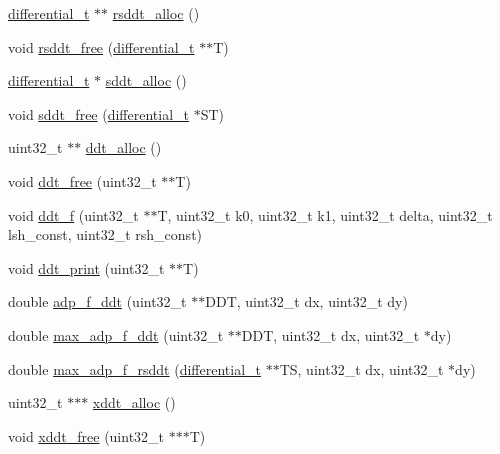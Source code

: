 \begin{DoxyCompactItemize}
\item 
\hyperlink{structdifferential__t}{differential\-\_\-t} $\ast$$\ast$ \hyperlink{adp-tea-f-fk-ddt_8hh_a9b33673043159fc8155fd759672a27b0}{rsddt\-\_\-alloc} ()
\item 
void \hyperlink{adp-tea-f-fk-ddt_8hh_a12b44b7012a0e2d3f1760784e6f8a482}{rsddt\-\_\-free} (\hyperlink{structdifferential__t}{differential\-\_\-t} $\ast$$\ast$\-T)
\item 
\hyperlink{structdifferential__t}{differential\-\_\-t} $\ast$ \hyperlink{adp-tea-f-fk-ddt_8hh_a0395ec92dbc818f2b8779389392ec023}{sddt\-\_\-alloc} ()
\item 
void \hyperlink{adp-tea-f-fk-ddt_8hh_a38f85fc23a1e6bf662e3359513451826}{sddt\-\_\-free} (\hyperlink{structdifferential__t}{differential\-\_\-t} $\ast$\-S\-T)
\item 
uint32\-\_\-t $\ast$$\ast$ \hyperlink{adp-tea-f-fk-ddt_8hh_a700c0928ef26a9130e4309c8b603792c}{ddt\-\_\-alloc} ()
\item 
void \hyperlink{adp-tea-f-fk-ddt_8hh_a0cfc92867fc1d471847ec25a48bcfb8d}{ddt\-\_\-free} (uint32\-\_\-t $\ast$$\ast$\-T)
\item 
void \hyperlink{adp-tea-f-fk-ddt_8hh_af2b10deffd82820ece2d258c915c8a90}{ddt\-\_\-f} (uint32\-\_\-t $\ast$$\ast$\-T, uint32\-\_\-t k0, uint32\-\_\-t k1, uint32\-\_\-t delta, uint32\-\_\-t lsh\-\_\-const, uint32\-\_\-t rsh\-\_\-const)
\item 
void \hyperlink{adp-tea-f-fk-ddt_8hh_ae45c4755238695992a8343a7a5fe4e95}{ddt\-\_\-print} (uint32\-\_\-t $\ast$$\ast$\-T)
\item 
double \hyperlink{adp-tea-f-fk-ddt_8hh_af181e4e9f3fbd475e728cd1789d533f1}{adp\-\_\-f\-\_\-ddt} (uint32\-\_\-t $\ast$$\ast$\-D\-D\-T, uint32\-\_\-t dx, uint32\-\_\-t dy)
\item 
double \hyperlink{adp-tea-f-fk-ddt_8hh_af1fceea05ff2c63817e865a7e3b458fa}{max\-\_\-adp\-\_\-f\-\_\-ddt} (uint32\-\_\-t $\ast$$\ast$\-D\-D\-T, uint32\-\_\-t dx, uint32\-\_\-t $\ast$dy)
\item 
double \hyperlink{adp-tea-f-fk-ddt_8hh_a417cfc278c155913968b66d613570aec}{max\-\_\-adp\-\_\-f\-\_\-rsddt} (\hyperlink{structdifferential__t}{differential\-\_\-t} $\ast$$\ast$\-T\-S, uint32\-\_\-t dx, uint32\-\_\-t $\ast$dy)
\item 
uint32\-\_\-t $\ast$$\ast$$\ast$ \hyperlink{adp-tea-f-fk-ddt_8hh_a0396966a9a11ad40f31edafc85db591f}{xddt\-\_\-alloc} ()
\item 
void \hyperlink{adp-tea-f-fk-ddt_8hh_a114fedd486da22fbe4e4da1cd0c7ed17}{xddt\-\_\-free} (uint32\-\_\-t $\ast$$\ast$$\ast$\-T)
$$
\end{DoxyCompactItemize}
